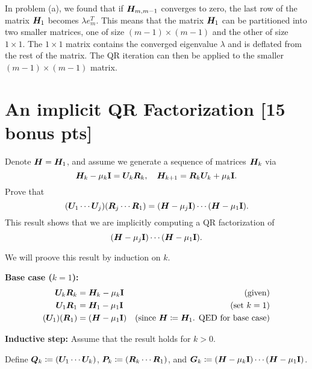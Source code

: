 \documentclass[twoside,10pt]{article}
\begin{document}
In problem (a), we found that if $\bm{H}_{m, m-1}$ converges to zero, the last row of the matrix $\bm{H}_1$ becomes $\lambda e_m^T$. This means that the matrix $\bm{H}_1$ can be partitioned into two smaller matrices, one of size $(m-1) \times (m-1)$ and the other of size $1 \times 1$. The $1 \times 1$ matrix contains the converged eigenvalue $\lambda$ and is deflated from the rest of the matrix. The QR iteration can then be applied to the smaller $(m-1) \times (m-1)$ matrix.

\section{An implicit QR Factorization [15 bonus pts]}
Denote $\bm{H} = \bm{H}_1$, and assume we generate a sequence of matrices $\bm{H}_k$ via 
\begin{equation}
  \bm{H}_k - \mu_k \mathbf{I} = \bm{U}_k \bm{R}_k, \quad \bm{H}_{k + 1} = \bm{R}_k \bm{U}_k + \mu_k \mathbf{I}. 
\end{equation}
Prove that 
\begin{equation}
  \left(\mtx{U}_1 \cdots \mtx{U}_j\right)\left(\mtx{R}_j \cdots \mtx{R}_1\right) = \left(\mtx{H} - \mu_{j} \Id\right) \cdots \left(\mtx{H} - \mu_1 \Id\right). 
\end{equation}
This result shows that we are implicitly computing a QR factorization of 
\begin{equation}
  \left(\mtx{H} - \mu_j \Id\right) \cdots \left(\mtx{H} - \mu_1 \Id\right).   
\end{equation}

\quad We will proove this result by induction on $k$.

\textbf{Base case ($k = 1$):}
\begin{align*}
  \mtx{U}_k \mtx{R}_k &= \mtx{H}_k - \mu_k \Id&\text{(given)}\\
  \mtx{U}_1 \mtx{R}_1 &= \mtx{H}_1 - \mu_1 \Id&\text{(set $k = 1$)}\\
  \left(\mtx{U}_1\right)\left(\mtx{R}_1\right) &= \left(\mtx{H} - \mu_1 \Id\right)&\text{(since $\mtx{H} \coloneqq \mtx{H}_1$. QED for base case)}
\end{align*}

\textbf{Inductive step:}
Assume that the result holds for $k > 0$.

Define $\mtx{Q}_k \coloneqq \left(\mtx{U}_1 \cdots \mtx{U}_k\right)$, $\mtx{P}_k \coloneqq \left(\mtx{R}_k \cdots \mtx{R}_1\right)$, and $\mtx{G}_k \coloneqq \left(\mtx{H} - \mu_k \Id\right) \cdots \left(\mtx{H} - \mu_1 \Id\right)$.
\end{document}
